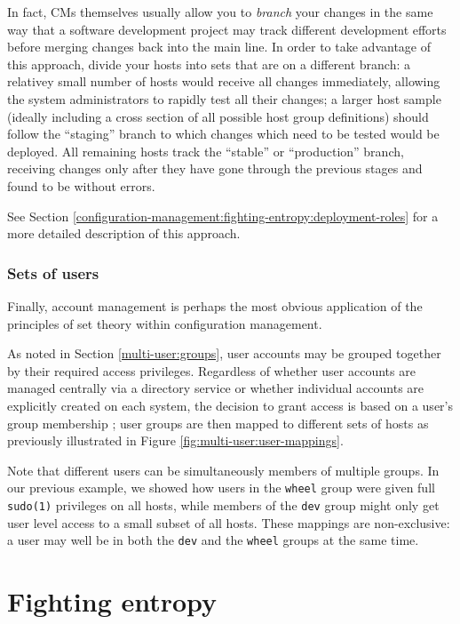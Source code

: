 In fact, CMs themselves usually allow you to {\em
branch} your changes in the same way that a software
development project may track different development
efforts before merging changes back into the main
line.  In order to take advantage of this approach,
divide your hosts into sets that are on a different
branch: a relativey small number of hosts would
receive all changes immediately, allowing the system
administrators to rapidly test all their changes; a
larger host sample (ideally including a cross section
of all possible host group definitions) should follow
the ``staging'' branch to which changes which need to
be tested would be deployed.  All remaining hosts
track the ``stable'' or ``production'' branch,
receiving changes only after they have gone through
the previous stages and found to be without errors.

See Section
\ref{configuration-management:fighting-entropy:deployment-roles}
for a more detailed description of this approach.

\subsubsection*{Sets of users}

Finally, account management is perhaps the most
obvious application of the principles of set theory
within configuration management.

As noted in Section \ref{multi-user:groups}, user
accounts may be grouped together by their required
access privileges.  Regardless of whether user
accounts are managed centrally via a directory service
or whether individual accounts are explicitly created
on each system, the decision to grant access is based
on a user's group membership ;  user groups are then
mapped to different sets of hosts as previously
illustrated in Figure
\ref{fig:multi-user:user-mappings}.

Note that different users can be simultaneously
members of multiple groups.  In our previous example,
we showed how users in the {\tt wheel} group were
given full {\tt sudo(1)} privileges on all hosts,
while members of the {\tt dev} group might only get
user level access to a small subset of all hosts.
These mappings are non-exclusive: a user may well be
in both the {\tt dev} and the {\tt wheel} groups at
the same time.


\section{Fighting entropy}
\label{configuration-management:fighting-entropy}

